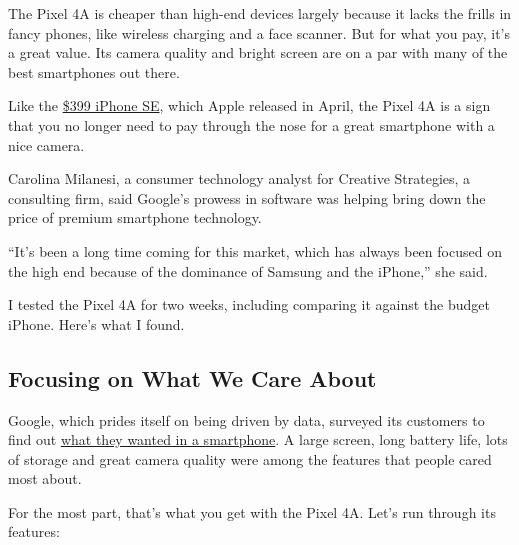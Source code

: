 The Pixel 4A is cheaper than high-end devices largely because it lacks
the frills in fancy phones, like wireless charging and a face scanner.
But for what you pay, it's a great value. Its camera quality and bright
screen are on a par with many of the best smartphones out there.

Like the
\href{https://www.nytimes.com/2020/05/06/technology/personaltech/apple-iphone-se-review.html}{\$399
iPhone SE}, which Apple released in April, the Pixel 4A is a sign that
you no longer need to pay through the nose for a great smartphone with a
nice camera.

Carolina Milanesi, a consumer technology analyst for Creative
Strategies, a consulting firm, said Google's prowess in software was
helping bring down the price of premium smartphone technology.

``It's been a long time coming for this market, which has always been
focused on the high end because of the dominance of Samsung and the
iPhone,'' she said.

I tested the Pixel 4A for two weeks, including comparing it against the
budget iPhone. Here's what I found.

\hypertarget{focusing-on-what-we-care-about}{%
\subsection{Focusing on What We Care
About}\label{focusing-on-what-we-care-about}}

Google, which prides itself on being driven by data, surveyed its
customers to find out
\href{https://www.statista.com/chart/5995/the-most-wanted-smartphone-features/}{what
they wanted in a smartphone}. A large screen, long battery life, lots of
storage and great camera quality were among the features that people
cared most about.

For the most part, that's what you get with the Pixel 4A. Let's run
through its features:


